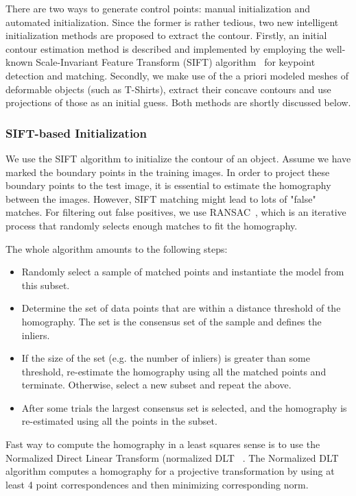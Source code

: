 \documentclass[conference]{IEEEtran}
\begin{document}
There are two ways to generate control points:
manual initialization and automated initialization. 
Since the former is rather tedious, two new
intelligent initialization methods are proposed to extract the
contour. Firstly, an initial contour estimation method is described and
implemented by employing the well-known Scale-Invariant Feature Transform 
(SIFT) algorithm~\cite{lowe2004distinctive} for
keypoint detection and matching. Secondly, we make use of the a priori
modeled meshes of deformable objects (such as T-Shirts), extract their
concave contours and use projections of those as an initial guess. Both 
methods are shortly discussed below.

\subsubsection{SIFT-based Initialization}
\label{sec:sift}
We use the SIFT algorithm to initialize the
contour of an object. Assume we have marked the boundary points in the
training images. In order to project these boundary points to the test
image, it is essential to estimate the homography between the
images. However, SIFT matching might lead to lots of "false" matches.
For filtering out false positives, we use RANSAC~\cite{fischler1981random}, 
which is an iterative process that randomly selects enough matches to fit the
homography.

The whole algorithm amounts to the following steps: 


\begin{itemize}
\item  Randomly select a sample of matched points and instantiate the
  model from this subset.
\item Determine the set of data points that are within a distance
  threshold of the homography. The set is the consensus set of the sample
  and defines the inliers.
\item If the size of the set (e.g. the number of inliers) is greater
  than some threshold, re-estimate the homography using all the matched
  points and terminate. Otherwise, select a new subset and repeat the
  above.
\item After some trials the largest consensus set is selected, and the
  homography is re-estimated using all the points in the subset.
\end{itemize}
Fast way to compute the homography in a least squares sense is to use the Normalized
Direct Linear Transform (normalized
DLT ~\cite{hartley2003multiple}. The Normalized DLT algorithm computes
a homography for a projective transformation by using at least 4 point
correspondences and then minimizing corresponding norm.
\end{document}
